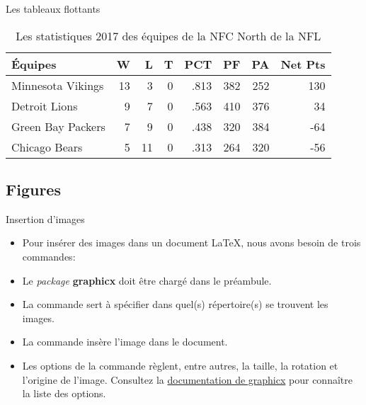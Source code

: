 \begin{frame}[fragile]{Les tableaux flottants}
\begin{onlyenv}
		\begin{table}
			\begin{tabularx}{\textwidth}{X|rrr|r|rrr}
				Équipes				&	W	&	L	&	T	&	PCT		&	PF	&	PA	&	Net Pts \\
				\hline
				Minnesota Vikings	&	13	&	3	&	0	&	.813	&	382	&	252	&	130 \\
				Detroit Lions		&	9	&	7	&	0	&	.563	&	410	&	376	&	34 \\
				Green Bay Packers	&	7	&	9	& 	0	&	.438	&	320	&	384	&	-64 \\
				Chicago Bears		&	5	&	11	&	0	&	.313	&	264	&	320	&	-56
			\end{tabularx}
			\caption{Les statistiques 2017 des équipes de la NFC North de la NFL}
		\end{table}
	\end{onlyenv}
\end{frame}

\subsection{Figures}

\begin{frame}[fragile,c]{Insertion d'images}
	\begin{itemize}
		\item Pour insérer des images dans un document \LaTeX, nous avons besoin de trois commandes:

		\pause
		\item Le \emph{package} \textbf{graphicx} doit être chargé dans le préambule.
		\item La commande  sert à spécifier dans quel(s) répertoire(s) se trouvent
			les images.
		\item La commande  insère l'image dans le document.
		\item Les options de la commande  règlent, entre autres, la taille, la rotation et l'origine de l'image. Consultez la \href{http://mirrors.ctan.org/macros/latex/required/graphics/grfguide.pdf}{documentation de graphicx} pour connaître la liste des options.
	\end{itemize}
\end{frame}

